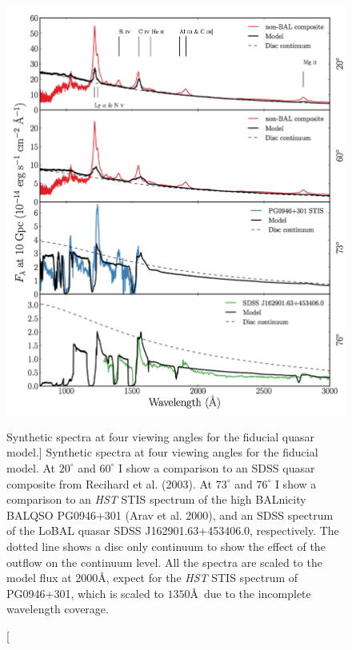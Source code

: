 \begin{figure}
\centering
\includegraphics[width=1.0\textwidth]{figures/06-agnpaper/fig3.png}
\caption
[Synthetic spectra at four viewing angles for the fiducial quasar model.]
{
Synthetic spectra at four viewing angles for the fiducial model. At 
$20^\circ$ and $60^\circ$ I show a comparison to an SDSS quasar composite
from Recihard et al. (2003). At $73^\circ$ and $76^\circ$ I show a comparison to
an {\sl HST} STIS spectrum of the high BALnicity BALQSO 
PG0946+301 (Arav et al. 2000), and an SDSS spectrum of the LoBAL quasar 
SDSS J162901.63+453406.0, respectively. The dotted line shows a disc
only continuum to show the effect of the outflow on the continuum level. 
All the spectra are scaled to the model flux at $2000$\AA, expect for the 
{\sl HST} STIS spectrum of PG0946+301, which is scaled to $1350$\AA\
due to the incomplete wavelength coverage.
}
\label{fig:uvspec}
\end{figure}

